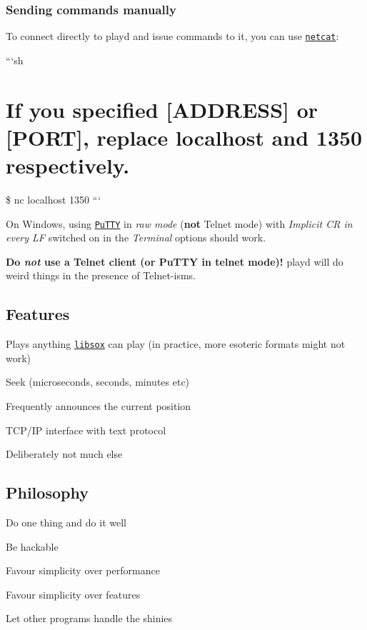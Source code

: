 \subsubsection*{Sending commands manually}

To connect directly to {\ttfamily playd} and issue commands to it, you can use \href{http://nc110.sourceforge.net/}{\tt netcat}\+:

```sh \section*{If you specified \mbox{[}A\+D\+D\+R\+E\+S\+S\mbox{]} or \mbox{[}P\+O\+R\+T\mbox{]}, replace localhost and 1350 respectively.}

\$ nc localhost 1350 ```

On Windows, using \href{http://www.chiark.greenend.org.uk/~sgtatham/putty/}{\tt Pu\+T\+T\+Y} in {\itshape raw mode} ({\bfseries not} Telnet mode) with {\itshape Implicit C\+R in every L\+F} switched on in the {\itshape Terminal} options should work.

{\bfseries Do {\itshape not} use a Telnet client (or Pu\+T\+T\+Y in telnet mode)!} {\ttfamily playd} will do weird things in the presence of Telnet-\/isms.

\subsection*{Features}


\begin{DoxyItemize}
\item Plays anything \href{http://sox.sourceforge.net/}{\tt libsox} can play (in practice, more esoteric formats might not work)
\item Seek (microseconds, seconds, minutes etc)
\item Frequently announces the current position
\item T\+C\+P/\+I\+P interface with text protocol
\item Deliberately not much else
\end{DoxyItemize}

\subsection*{Philosophy}


\begin{DoxyItemize}
\item Do one thing and do it well
\item Be hackable
\item Favour simplicity over performance
\item Favour simplicity over features
\item Let other programs handle the shinies
\end{DoxyItemize}

